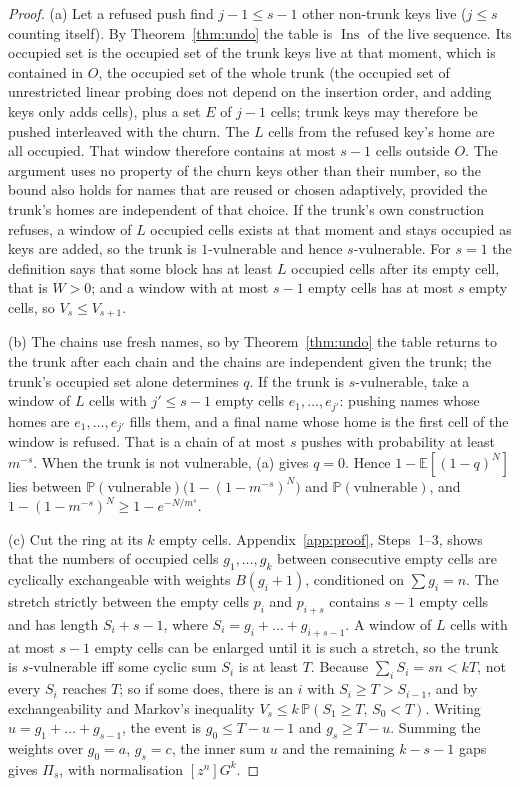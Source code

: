 \documentclass[11pt,a4paper]{article}
\theoremstyle{definition}
\theoremstyle{remark}
\newcommand{\Prob}{\mathbb{P}}
\newcommand{\E}{\mathbb{E}}
\DeclareMathOperator{\Ins}{Ins}
\begin{document}
\begin{proof}
(a) Let a refused push find $j-1\le s-1$ other non-trunk keys live ($j\le s$ counting itself). By Theorem~\ref{thm:undo} the table is $\Ins$ of the live sequence. Its occupied set is the occupied set of the trunk keys live at that moment, which is contained in $O$, the occupied set of the whole trunk (the occupied set of unrestricted linear probing does not depend on the insertion order, and adding keys only adds cells), plus a set $E$ of $j-1$ cells; trunk keys may therefore be pushed interleaved with the churn. The $L$ cells from the refused key's home are all occupied. That window therefore contains at most $s-1$ cells outside $O$. The argument uses no property of the churn keys other than their number, so the bound also holds for names that are reused or chosen adaptively, provided the trunk's homes are independent of that choice. If the trunk's own construction refuses, a window of $L$ occupied cells exists at that moment and stays occupied as keys are added, so the trunk is $1$-vulnerable and hence $s$-vulnerable. For $s=1$ the definition says that some block has at least $L$ occupied cells after its empty cell, that is $W>0$; and a window with at most $s-1$ empty cells has at most $s$ empty cells, so $V_s\le V_{s+1}$.

(b) The chains use fresh names, so by Theorem~\ref{thm:undo} the table returns to the trunk after each chain and the chains are independent given the trunk; the trunk's occupied set alone determines $q$. If the trunk is $s$-vulnerable, take a window of $L$ cells with $j'\le s-1$ empty cells $e_1,\dots,e_{j'}$: pushing names whose homes are $e_1,\dots,e_{j'}$ fills them, and a final name whose home is the first cell of the window is refused. That is a chain of at most $s$ pushes with probability at least $m^{-s}$. When the trunk is not vulnerable, (a) gives $q=0$. Hence $1-\E[(1-q)^N]$ lies between $\Prob(\text{vulnerable})\bigl(1-(1-m^{-s})^N\bigr)$ and $\Prob(\text{vulnerable})$, and $1-(1-m^{-s})^N\ge1-e^{-N/m^s}$.

(c) Cut the ring at its $k$ empty cells. Appendix~\ref{app:proof}, Steps~1--3, shows that the numbers of occupied cells $g_1,\dots,g_k$ between consecutive empty cells are cyclically exchangeable with weights $B(g_i{+}1)$, conditioned on $\sum g_i=n$. The stretch strictly between the empty cells $p_i$ and $p_{i+s}$ contains $s-1$ empty cells and has length $S_i+s-1$, where $S_i=g_i+\dots+g_{i+s-1}$. A window of $L$ cells with at most $s-1$ empty cells can be enlarged until it is such a stretch, so the trunk is $s$-vulnerable iff some cyclic sum $S_i$ is at least $T$. Because $\sum_iS_i=sn<kT$, not every $S_i$ reaches $T$; so if some does, there is an $i$ with $S_i\ge T>S_{i-1}$, and by exchangeability and Markov's inequality $V_s\le k\,\Prob(S_1\ge T,\,S_0<T)$. Writing $u=g_1+\dots+g_{s-1}$, the event is $g_0\le T-u-1$ and $g_s\ge T-u$. Summing the weights over $g_0=a$, $g_s=c$, the inner sum $u$ and the remaining $k-s-1$ gaps gives $\Pi_s$, with normalisation $[z^n]G^k$.
\end{proof}
\end{document}

